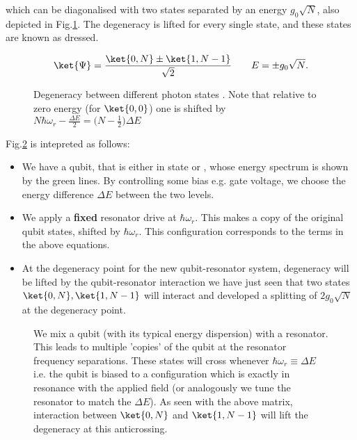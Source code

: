 \noindent which can be diagonalised with two states separated by an energy $ g_0\sqrt{N} $, also depicted in
Fig.\ref{qrLevel}. The degeneracy is lifted for every single state, and these states are known as dressed.

\begin{equation}
  \ket{\Psi} = \frac{\ket{0,N}\pm\ket{1,N-1}}{\sqrt{2}} \qquad E = \pm{g_0\sqrt{N}}.
\end{equation}

\begin{figure}
  \caption{Degeneracy between different photon states \label{qrLevel}. Note that relative to zero energy (for $ \ket{0,0} $) one
    is shifted by $ N\hbar\omega_r-\frac{\Delta E}{2}=\bigg(N-\frac{1}{2}\bigg)\Delta E $}
\end{figure}

Fig.\ref{qrDresssed} is intepreted as follows:

\begin{itemize}
\item We have a qubit, that is either in state  or , whose energy spectrum is shown by the green lines. By
  controlling some bias e.g. gate voltage, we choose the energy difference $ \Delta E $ between the two levels.
\item We apply a \textbf{fixed} resonator drive at $ \hbar\omega_r $. This makes a copy of the original qubit states, shifted by
  $ \hbar\omega_r $. This configuration corresponds to the  terms in the above equations.
\item At the degeneracy point for the new qubit-resonator system, degeneracy will be lifted by the qubit-resonator interaction \ra
  we have just seen that two states $ \ket{0,N}, \ket{1,N-1} $ will interact and developed a splitting of $ 2g_0\sqrt{N} $ at the
  degeneracy point. 
\end{itemize}

\begin{figure}[h]
  \caption{We mix a qubit (with its typical energy dispersion) with a resonator. This leads to multiple 'copies' of the qubit at
    the resonator frequency separations. These states will cross whenever $ \hbar\omega_r\equiv\Delta E $ i.e. the qubit is biased
    to a configuration which is exactly in resonance with the applied field (or analogously we tune the resonator to match the
    $ \Delta E $). As seen with the above matrix, interaction between $\ket{0,N}$ and $ \ket{1,N-1} $ will lift the degeneracy at
    this anticrossing.\label{qrDresssed}}
\end{figure}

